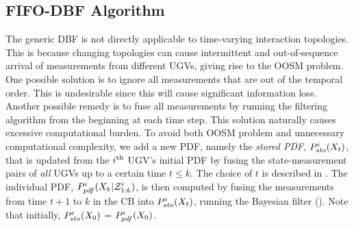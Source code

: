 	\subsection{FIFO-DBF Algorithm}
	The generic DBF is not directly applicable to time-varying interaction topologies. 
	This is because changing topologies can cause intermittent and out-of-sequence arrival of measurements from different UGVs, giving rise to the OOSM problem.
	One possible solution is to ignore all measurements that are out of the temporal order.
	This is undesirable since this will cause significant information loss.
	Another possible remedy is to fuse all measurements by running the filtering algorithm from the beginning at each time step.
	This solution naturally causes excessive computational burden.
	To avoid both OOSM problem and unnecessary computational complexity, we add a new PDF, namely the \textit{stored PDF}, $P^{i}_{sto}(X_t)$, that is updated from the $i^\text{th}$ UGV's initial PDF by fusing the state-measurement pairs of \textit{all} UGVs up to a certain time $t\le k$.
	The choice of $t$ is described in .
	The individual PDF, $P^i_{pdf}(X_k|\mathcal{Z}^i_{1:k})$, is then computed by fusing the measurements from time $t+1$ to $k$ in the CB into $P^i_{sto}(X_t)$, running the Bayesian filter ().
	Note that initially, $P^{i}_{sto}(X_0)$ = $P^i_{pdf}(X_0)$.
	
